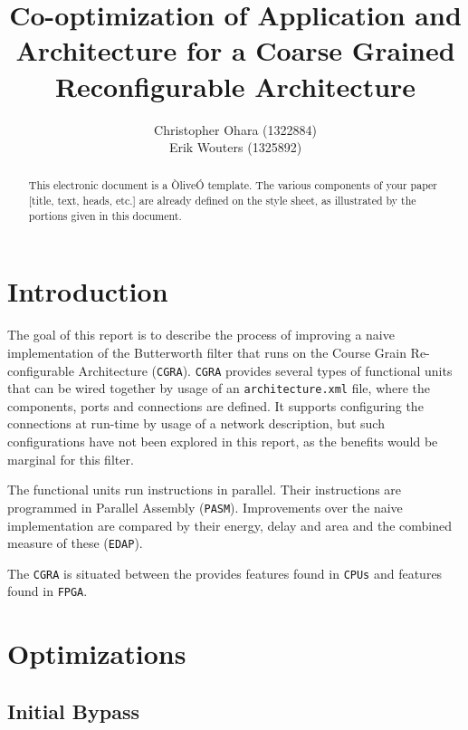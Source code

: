 \documentclass[letterpaper, 10 pt, conference]{ieeeconf}  %
\title{\LARGE \bf
Co-optimization of Application and Architecture
for a Coarse Grained Reconfigurable Architecture
}
\author{Christopher Ohara (1322884) \\
Erik Wouters (1325892)
}
\begin{document}
\maketitle
\thispagestyle{empty}
\pagestyle{empty}


\begin{abstract}

This electronic document is a ÒliveÓ template. The various components of your paper [title, text, heads, etc.] are already defined on the style sheet, as illustrated by the portions given in this document.

\end{abstract}


\section{Introduction}

The goal of this report is to describe the process of improving a naive implementation of the Butterworth filter\cite{Podder} that runs on the Course Grain Re-configurable Architecture (\texttt{CGRA}). \texttt{CGRA} provides several types of functional units that can be wired together by usage of an \texttt{architecture.xml} file, where the components, ports and connections are defined. It supports configuring the connections at run-time by usage of a network description, but such configurations have not been explored in this report, as the benefits would be marginal for this filter.

The functional units run instructions in parallel. Their instructions are programmed in Parallel Assembly (\texttt{PASM}). Improvements over the naive implementation are compared by their energy,  delay  and  area and the combined measure of these (\texttt{EDAP}).

The \texttt{CGRA} is situated between the 
provides features found in \texttt{CPUs} and features found in \texttt{FPGA}.

\section{Optimizations}

\subsection{Initial Bypass}
\end{document}

